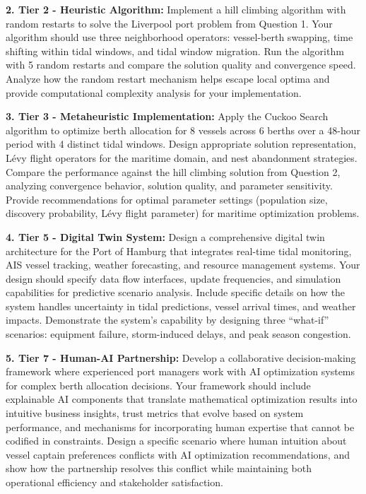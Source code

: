 \documentclass{article}
\begin{document}
\textbf{2. Tier 2 - Heuristic Algorithm:} Implement a hill climbing algorithm with random restarts to solve the Liverpool port problem from Question 1. Your algorithm should use three neighborhood operators: vessel-berth swapping, time shifting within tidal windows, and tidal window migration. Run the algorithm with 5 random restarts and compare the solution quality and convergence speed. Analyze how the random restart mechanism helps escape local optima and provide computational complexity analysis for your implementation.

\textbf{3. Tier 3 - Metaheuristic Implementation:} Apply the Cuckoo Search algorithm to optimize berth allocation for 8 vessels across 6 berths over a 48-hour period with 4 distinct tidal windows. Design appropriate solution representation, Lévy flight operators for the maritime domain, and nest abandonment strategies. Compare the performance against the hill climbing solution from Question 2, analyzing convergence behavior, solution quality, and parameter sensitivity. Provide recommendations for optimal parameter settings (population size, discovery probability, Lévy flight parameter) for maritime optimization problems.

\textbf{4. Tier 5 - Digital Twin System:} Design a comprehensive digital twin architecture for the Port of Hamburg that integrates real-time tidal monitoring, AIS vessel tracking, weather forecasting, and resource management systems. Your design should specify data flow interfaces, update frequencies, and simulation capabilities for predictive scenario analysis. Include specific details on how the system handles uncertainty in tidal predictions, vessel arrival times, and weather impacts. Demonstrate the system's capability by designing three ``what-if'' scenarios: equipment failure, storm-induced delays, and peak season congestion.

\textbf{5. Tier 7 - Human-AI Partnership:} Develop a collaborative decision-making framework where experienced port managers work with AI optimization systems for complex berth allocation decisions. Your framework should include explainable AI components that translate mathematical optimization results into intuitive business insights, trust metrics that evolve based on system performance, and mechanisms for incorporating human expertise that cannot be codified in constraints. Design a specific scenario where human intuition about vessel captain preferences conflicts with AI optimization recommendations, and show how the partnership resolves this conflict while maintaining both operational efficiency and stakeholder satisfaction.
\end{document}
